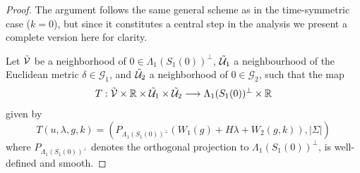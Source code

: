\documentclass[12pt,a4paper]{amsart}
\theoremstyle{plain}
\theoremstyle{definition}
\begin{document}
\begin{proof}
The argument follows the same general scheme as in the time-symmetric case (\(k=0\)),
but since it constitutes a central step in the analysis we present a complete version here for clarity.

   Let $\Tilde{\mathcal{V}} $ be a neighborhood of $0 \in \Lambda_1(S_1(0))^\bot $,  $\Tilde{\mathcal{U}}_1 $ a neighbourhood of the Euclidean metric $\delta \in  \mathcal{G}_1$, and $\Tilde{\mathcal{U}}_2 $ a neighborhood of $0 \in  \mathcal{G}_2$, such that the map 
   \begin{equation}
       T: \Tilde{\mathcal{V}} \times \mathbb{R} \times \Tilde{\mathcal{U}}_1 \times \Tilde{\mathcal{U}}_2   \longrightarrow \Lambda_1(S_1(0))^\bot \times  \mathbb{R}
   \end{equation}
   given by 
   \begin{equation}
       T(u,\lambda, g, k)= \left( P_{\Lambda_1(S_1(0))^\bot}(W_1(g)+H \lambda +W_2(g,k)), |\Sigma|   \right)
   \end{equation}
where $P_{\Lambda_1(S_1(0))^\bot}$ denotes the orthogonal projection to $ \Lambda_1(S_1(0))^\bot$, is well-defined and smooth.
   

\end{proof}
\end{document}
